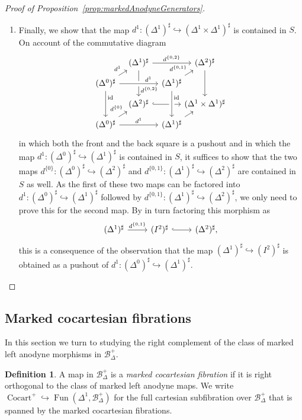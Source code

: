 \documentclass[reqno]{amsart}
\numberwithin{equation}{subsection}
\theoremstyle{plain}
\theoremstyle{definition}
\newtheorem{definition}[equation]{Definition}
\let\scr=\mathcal
\let\into=\hookrightarrow
\def\BB{\scr B}
\DeclareMathOperator{\id}{id}
\DeclareMathOperator{\Cocart}{Cocart}
\DeclareMathOperator{\Fun}{Fun}
\newcommand{\mSimp}[1]{#1_{\Delta}^+}
\begin{document}
\begin{proof}[{Proof of Proposition~\ref{prop:markedAnodyneGenerators}}]
\begin{enumerate}[resume]
	\item Finally, we show that the map $d^1\colon(\Delta^1)^\sharp\into(\Delta^1\times\Delta^1)^\sharp$ is contained in $S$. On account of the commutative diagram
	\begin{equation*}
	\begin{tikzcd}[column sep={4em,between origins}, row sep={2.5em,between origins}]
	& (\Delta^1)^\sharp\arrow[rr, "d^{\{0,2\}}"]\arrow[dd, "d^{\{0,2\}}", near end] && (\Delta^2)^\sharp\arrow[dd]\\
	(\Delta^0)^\sharp\arrow[dd, "\id",near start]\arrow[rr, "d^1", crossing over, near end] \arrow[ur, "d^1"]&& (\Delta^1)^\sharp\arrow[ur, "d^{\{0,1\}}"] & \\
	& (\Delta^2)^\sharp\arrow[rr, hookrightarrow] && (\Delta^1\times\Delta^1)^\sharp\\
	(\Delta^0)^\sharp\arrow[rr, "d^1"] \arrow[ur, "d^{\{0\}}", near end]&& (\Delta^1)^\sharp\arrow[from=uu, "\id", crossing over, near start]\arrow[ur] &
	\end{tikzcd}
	\end{equation*}
	in which both the front and the back square is a pushout and in which the map $d^1\colon (\Delta^0)^\sharp\into(\Delta^1)^\sharp$ is contained in $S$, it suffices to show that the two maps $d^{\{0\}}\colon (\Delta^0)^\sharp\into(\Delta^2)^\sharp$ and $d^{\{0,1\}}\colon(\Delta^1)^\sharp\into(\Delta^2)^\sharp$ are contained in $S$ as well.
	As the first of these two maps can be factored into $d^1\colon (\Delta^0)^\sharp\into(\Delta^1)^\sharp$ followed by $d^{\{0,1\}}\colon (\Delta^1)^\sharp\into(\Delta^2)^\sharp$, we only need to prove this for the second map. By in turn factoring this morphism as
	\begin{equation*}
	\begin{tikzcd}
	(\Delta^1)^\sharp\arrow[r, "d^{\{0,1\}}"] & (I^2)^\sharp\arrow[r, hookrightarrow] & (\Delta^2)^\sharp, 
	\end{tikzcd}
	\end{equation*}
	this is a consequence of the observation that the map $(\Delta^1)^\sharp\into(I^2)^\sharp$ is obtained as a pushout of $d^1\colon(\Delta^0)^\sharp\into(\Delta^1)^\sharp$.
	\end{enumerate}
	\fi
\end{proof}

\subsection{Marked cocartesian fibrations}
\label{sec:markedCocartesianFibrations}
In this section we turn to studying the right complement of the class of marked left anodyne morphisms in $\mSimp\BB$.
\begin{definition}
	\label{def:cocartesianFibrationsMarked}
	A map in $\mSimp\BB$ is a \emph{marked cocartesian fibration} if it is right orthogonal to the class of marked left anodyne maps. We write $\Cocart^+\into\Fun(\Delta^1,\mSimp\BB)$ for the full cartesian subfibration over $\mSimp\BB$ that is spanned by the marked cocartesian fibrations.
\end{definition}
\end{document}
